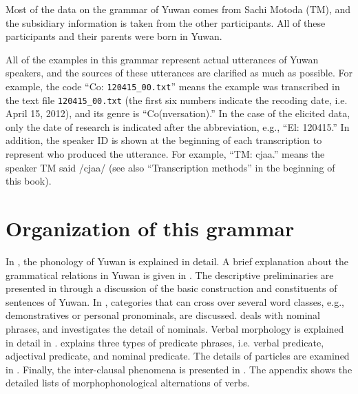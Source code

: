 Most of the data on the grammar of Yuwan comes from Sachi Motoda (TM), and the subsidiary information is taken from the other participants. All of these participants and their parents were born in Yuwan.

All of the examples in this grammar represent actual utterances of Yuwan speakers, and the sources of these utterances are clarified as much as possible. For example, the code “Co: \texttt{120415\_00.txt}” means the example was transcribed in the text file \texttt{120415\_00.txt} (the first six numbers indicate the recoding date, i.e. April 15, 2012), and its genre is “Co(nversation).” In the case of the elicited data, only the date of research is indicated after the abbreviation, e.g., “El: 120415.” In addition, the speaker ID is shown at the beginning of each transcription to represent who produced the utterance. For example, “TM: cjaa.” means the speaker TM said /cjaa/ (see also “Transcription methods” in the beginning of this book).

\section{Organization of this grammar}
\hypertarget{RefHeadingToc395696959}{}
In , the phonology of Yuwan is explained in detail. A brief explanation about the grammatical relations in Yuwan is given in . The descriptive preliminaries are presented in  through a discussion of the basic construction and constituents of sentences of Yuwan. In , categories that can cross over several word classes, e.g., demonstratives or personal pronominals, are discussed.  deals with nominal phrases, and  investigates the detail of nominals. Verbal morphology is explained in detail in .  explains three types of predicate phrases, i.e. verbal predicate, adjectival predicate, and nominal predicate. The details of particles are examined in . Finally, the inter-clausal phenomena is presented in . The appendix shows the detailed lists of morphophonological alternations of verbs.
